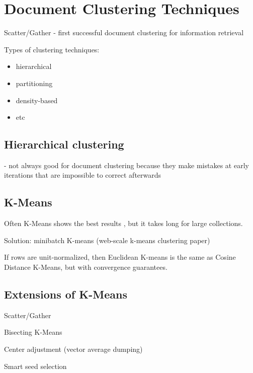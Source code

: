 \section{Document Clustering Techniques}

Scatter/Gather - first successful document clustering for information retrieval \cite{cutting1992scatter}


Types of clustering techniques:
\begin{itemize}
  \item hierarchical
  \item partitioning
  \item density-based
  \item etc
\end{itemize}


\subsection{Hierarchical clustering}


\cite{steinbach2000comparison} - not always good for document clustering
because they make mistakes at early iterations that are impossible
to correct afterwards


\subsection{K-Means} \label{sec:kmeans}


Often K-Means shows the best results \cite{hall2012evaluating} \cite{steinbach2000comparison}, but it takes long for large collections.

Solution: minibatch K-means (web-scale k-means clustering paper) \cite{sculley2010web}

If rows are unit-normalized, then Euclidean K-means is the same 
as Cosine Distance K-Means, but with convergence guarantees. 


\subsection{Extensions of K-Means} \label{sec:kmeans-ext}

Scatter/Gather \cite{cutting1992scatter}

Bisecting K-Means \cite{steinbach2000comparison}

Center adjustment (vector average dumping) \cite{larsen1999fast}

Smart seed selection \cite{cutting1992scatter} \cite{larsen1999fast}



